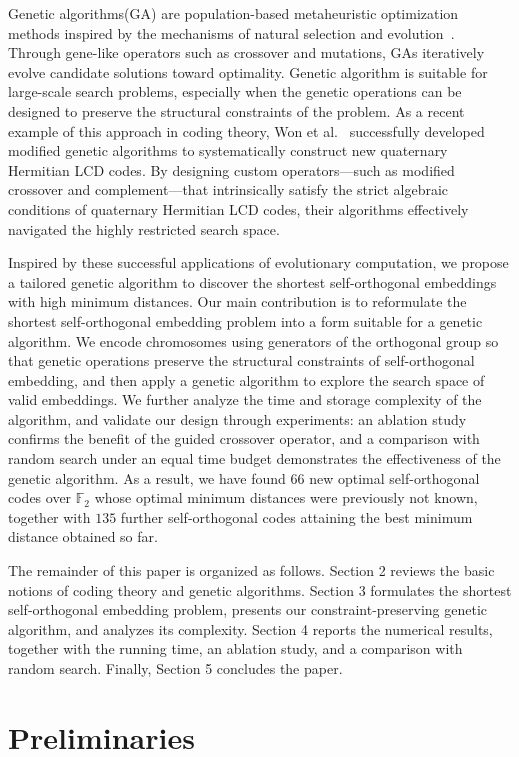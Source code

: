 \documentclass{article}
\begin{document}
Genetic algorithms(GA) are population-based metaheuristic optimization methods inspired by the mechanisms of natural selection and evolution~\cite{h-1975}. Through gene-like operators such as crossover and mutations, GAs iteratively evolve candidate solutions toward optimality. Genetic algorithm is suitable for large-scale search problems, especially when the genetic operations can be designed to preserve the structural constraints of the problem. As a recent example of this approach in coding theory, Won et al.~\cite{w-2026} successfully developed modified genetic algorithms to systematically construct new quaternary Hermitian LCD codes. By designing custom operators—such as modified crossover and complement—that intrinsically satisfy the strict algebraic conditions of quaternary Hermitian LCD codes, their algorithms effectively navigated the highly restricted search space.

Inspired by these successful applications of evolutionary computation, we propose a tailored genetic algorithm to discover the shortest self-orthogonal embeddings with high minimum distances. Our main contribution is to reformulate the shortest self-orthogonal embedding problem into a form suitable for a genetic algorithm. We encode chromosomes using generators of the orthogonal group so that genetic operations preserve the structural constraints of self-orthogonal embedding, and then apply a genetic algorithm to explore the search space of valid embeddings. We further analyze the time and storage complexity of the algorithm, and validate our design through experiments: an ablation study confirms the benefit of the guided crossover operator, and a comparison with random search under an equal time budget demonstrates the effectiveness of the genetic algorithm. As a result, we have found $66$ new optimal self-orthogonal codes over $\mathbb{F}_2$ whose optimal minimum distances were previously not known, together with $135$ further self-orthogonal codes attaining the best minimum distance obtained so far.

The remainder of this paper is organized as follows. Section 2 reviews the basic notions of coding theory and genetic algorithms. Section 3 formulates the shortest self-orthogonal embedding problem, presents our constraint-preserving genetic algorithm, and analyzes its complexity. Section 4 reports the numerical results, together with the running time, an ablation study, and a comparison with random search. Finally, Section 5 concludes the paper.

\section{Preliminaries}
\end{document}
